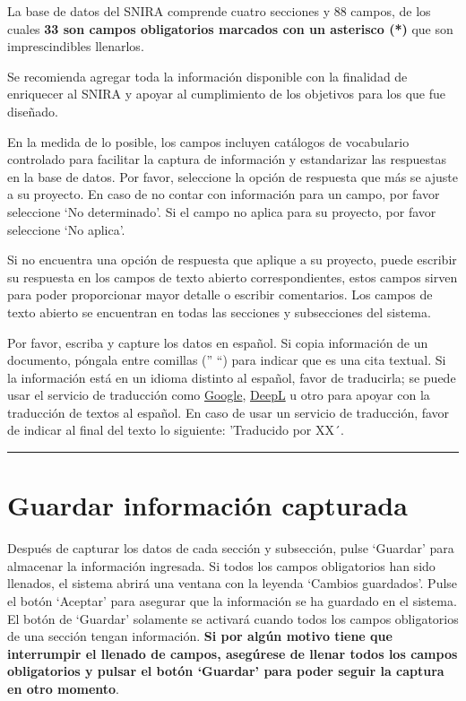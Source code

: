 \documentclass[
]{book}
\begin{document}
La base de datos del SNIRA comprende cuatro secciones y 88 campos, de los cuales {\textbf{33 son campos obligatorios marcados con un asterisco (*)}} que son imprescindibles llenarlos.

Se recomienda agregar toda la información disponible con la finalidad de enriquecer al SNIRA y apoyar al cumplimiento de los objetivos para los que fue diseñado.

En la medida de lo posible, los campos incluyen catálogos de vocabulario controlado para facilitar la captura de información y estandarizar las respuestas en la base de datos. Por favor, seleccione la opción de respuesta que más se ajuste a su proyecto. En caso de no contar con información para un campo, por favor seleccione `No determinado'. Si el campo no aplica para su proyecto, por favor seleccione `No aplica'.

Si no encuentra una opción de respuesta que aplique a su proyecto, puede escribir su respuesta en los campos de texto abierto correspondientes, estos campos sirven para poder proporcionar mayor detalle o escribir comentarios. Los campos de texto abierto se encuentran en todas las secciones y subsecciones del sistema.

Por favor, escriba y capture los datos en español. Si copia información de un documento, póngala entre comillas ('' ``) para indicar que es una cita textual. Si la información está en un idioma distinto al español, favor de traducirla; se puede usar el servicio de traducción como \href{https://translate.google.com.mx/?hl=es}{Google}, \href{https://www.deepl.com/es/translator}{DeepL} u otro para apoyar con la traducción de textos al español. En caso de usar un servicio de traducción, favor de indicar al final del texto lo siguiente: 'Traducido por XX´.

\begin{center}\rule{0.5\linewidth}{0.5pt}\end{center}

\hypertarget{guardar-informaciuxf3n-capturada}{%
\section*{Guardar información capturada}\label{guardar-informaciuxf3n-capturada}}

Después de capturar los datos de cada sección y subsección, pulse `Guardar' para almacenar la información ingresada. Si todos los campos obligatorios han sido llenados, el sistema abrirá una ventana con la leyenda `Cambios guardados'. Pulse el botón `Aceptar' para asegurar que la información se ha guardado en el sistema. El botón de `Guardar' solamente se activará cuando todos los campos obligatorios de una sección tengan información. \textbf{Si por algún motivo tiene que interrumpir el llenado de campos, asegúrese de llenar todos los campos obligatorios y pulsar el botón `Guardar' para poder seguir la captura en otro momento}.
\end{document}

